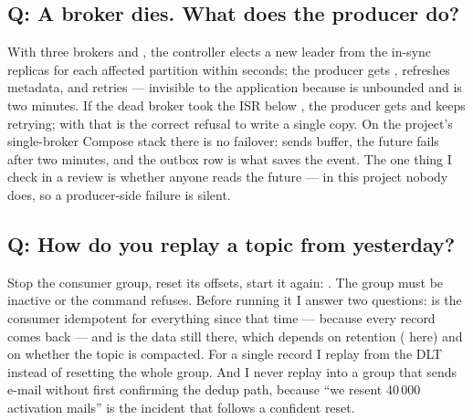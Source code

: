 \subsection*{Q: A broker dies. What does the producer do?}

With three brokers and , the controller
elects a new leader from the in-sync replicas for each affected
partition within seconds; the producer gets
, refreshes metadata, and retries ---
invisible to the application because  is unbounded and
 is two minutes. If the dead broker took the
ISR below , the producer gets
 and keeps retrying; with  that
is the correct refusal to write a single copy. On the project's
single-broker Compose stack there is no failover: sends buffer, the
future fails after two minutes, and the outbox row is what saves the
event. The one thing I check in a review is whether anyone reads the
future --- in this project nobody does, so a producer-side failure is
silent.

\subsection*{Q: How do you replay a topic from yesterday?}

Stop the consumer group, reset its offsets, start it again:
. The group must be inactive or the command refuses. Before
running it I answer two questions: is the consumer idempotent for
everything since that time --- because every record comes back --- and
is the data still there, which depends on retention ( here)
and on whether the topic is compacted. For a single record I replay
from the DLT instead of resetting the whole group. And I never replay
into a group that sends e-mail without first confirming the dedup path,
because ``we resent 40\,000 activation mails'' is the incident that
follows a confident reset.

